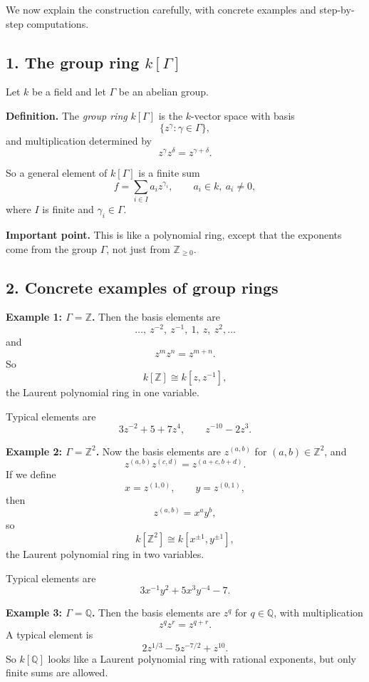 \documentclass[12pt,a4paper]{article}
\theoremstyle{notespace}
\begin{document}
We now explain the construction carefully, with concrete examples and step-by-step computations.

\subsection{1. The group ring \(k[\Gamma]\)}

Let \(k\) be a field and let \(\Gamma\) be an abelian group.

\textbf{Definition.}
The \emph{group ring} \(k[\Gamma]\) is the \(k\)-vector space with basis
\[
\{z^\gamma : \gamma\in \Gamma\},
\]
and multiplication determined by
\[
z^\gamma z^\delta = z^{\gamma+\delta}.
\]

So a general element of \(k[\Gamma]\) is a finite sum
\[
f=\sum_{i\in I} a_i z^{\gamma_i},
\qquad
a_i\in k,\ a_i\neq 0,
\]
where \(I\) is finite and \(\gamma_i\in \Gamma\).

\textbf{Important point.}
This is like a polynomial ring, except that the exponents come from the group \(\Gamma\), not just from \(\mathbb Z_{\ge 0}\).

\subsection{2. Concrete examples of group rings}

\textbf{Example 1: \(\Gamma=\mathbb Z\).}
Then the basis elements are
\[
\dots,\ z^{-2},\ z^{-1},\ 1,\ z,\ z^2,\dots
\]
and
\[
z^m z^n = z^{m+n}.
\]
So
\[
k[\mathbb Z]\cong k[z,z^{-1}],
\]
the Laurent polynomial ring in one variable.

Typical elements are
\[
3z^{-2}+5+7z^4,
\qquad
z^{-10}-2z^3.
\]

\textbf{Example 2: \(\Gamma=\mathbb Z^2\).}
Now the basis elements are \(z^{(a,b)}\) for \((a,b)\in\mathbb Z^2\), and
\[
z^{(a,b)}z^{(c,d)} = z^{(a+c,b+d)}.
\]
If we define
\[
x=z^{(1,0)},
\qquad
y=z^{(0,1)},
\]
then
\[
z^{(a,b)}=x^a y^b,
\]
so
\[
k[\mathbb Z^2]\cong k[x^{\pm1},y^{\pm1}],
\]
the Laurent polynomial ring in two variables.

Typical elements are
\[
3x^{-1}y^2 + 5x^3y^{-4} - 7.
\]

\textbf{Example 3: \(\Gamma=\mathbb Q\).}
Then the basis elements are \(z^q\) for \(q\in\mathbb Q\), with multiplication
\[
z^q z^r = z^{q+r}.
\]
A typical element is
\[
2z^{1/3} - 5z^{-7/2} + z^{10}.
\]
So \(k[\mathbb Q]\) looks like a Laurent polynomial ring with rational exponents, but only finite sums are allowed.
\end{document}
